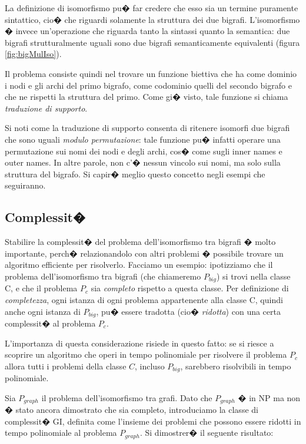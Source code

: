 La definizione di isomorfismo pu� far credere che esso sia un termine puramente sintattico, cio� che riguardi solamente la struttura dei due bigrafi. L'isomorfismo � invece un'operazione che riguarda tanto la sintassi quanto la semantica: due bigrafi strutturalmente uguali sono due bigrafi semanticamente equivalenti (figura \ref{fig:bigMulIso}).

Il problema consiste quindi nel trovare un funzione biettiva che ha come dominio i nodi e gli archi del primo bigrafo, come codominio quelli del secondo bigrafo e che ne rispetti la struttura del primo. Come gi� visto, tale funzione si chiama \emph{traduzione di supporto}.

Si noti come la traduzione di supporto consenta di ritenere isomorfi due bigrafi che sono uguali \emph{modulo permutazione}: tale funzione pu� infatti operare una permutazione sui nomi dei nodi e degli archi, cos� come sugli inner names e outer names. In altre parole, non c'� nessun vincolo sui nomi, ma solo sulla struttura del bigrafo. Si capir� meglio questo concetto negli esempi che seguiranno.


\subsection{Complessit�}\label{sub:isoComplexity}
Stabilire la complessit� del problema dell'isomorfismo tra bigrafi � molto importante, perch� relazionandolo con altri problemi � possibile trovare un algoritmo efficiente per risolverlo. Facciamo un esempio: ipotizziamo che il problema dell'isomorfismo tra bigrafi (che chiameremo $P_{big}$) si trovi nella classe C, e che il problema $P_c$ sia \emph{completo} rispetto a questa classe. Per definizione di \emph{completezza}, ogni istanza di ogni problema appartenente alla classe C, quindi anche ogni istanza di $P_{big}$, pu� essere tradotta (cio� \emph{ridotta}) con una certa complessit� al problema $P_c$.

L'importanza di questa considerazione risiede in questo fatto: se si riesce a scoprire un algoritmo che operi in tempo polinomiale per risolvere il problema $P_c$ allora tutti i problemi della classe $C$, incluso $P_{big}$, sarebbero risolvibili in tempo polinomiale.

Sia $P_{graph}$ il problema dell'isomorfismo tra grafi. Dato che $P_{graph}$ � in NP ma non � stato ancora dimostrato che sia completo, introduciamo la classe di complessit� GI, definita come l'insieme dei problemi che possono essere ridotti in tempo polinomiale al problema $P_{graph}$. Si dimostrer� il seguente risultato:

